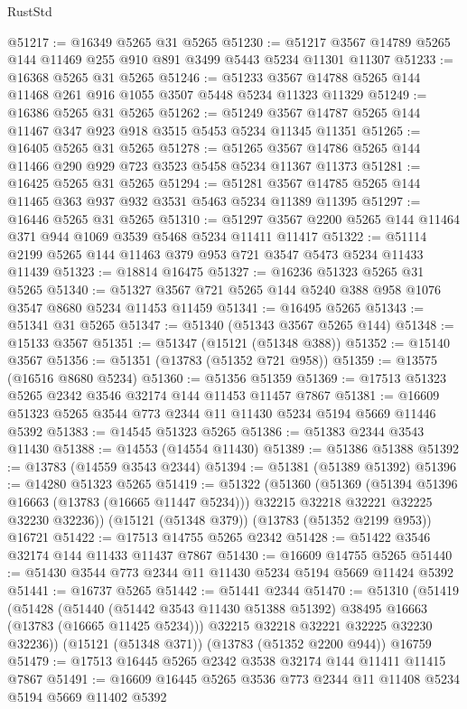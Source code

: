 \begin{lexlean}{RustStd}
\begin{coremodule}
@51217 := @16349 @5265 @31 @5265
@51230 := @51217 @3567 @14789 @5265 @144 @11469 @255 @910 @891 @3499 @5443 @5234 @11301 @11307
@51233 := @16368 @5265 @31 @5265
@51246 := @51233 @3567 @14788 @5265 @144 @11468 @261 @916 @1055 @3507 @5448 @5234 @11323 @11329
@51249 := @16386 @5265 @31 @5265
@51262 := @51249 @3567 @14787 @5265 @144 @11467 @347 @923 @918 @3515 @5453 @5234 @11345 @11351
@51265 := @16405 @5265 @31 @5265
@51278 := @51265 @3567 @14786 @5265 @144 @11466 @290 @929 @723 @3523 @5458 @5234 @11367 @11373
@51281 := @16425 @5265 @31 @5265
@51294 := @51281 @3567 @14785 @5265 @144 @11465 @363 @937 @932 @3531 @5463 @5234 @11389 @11395
@51297 := @16446 @5265 @31 @5265
@51310 := @51297 @3567 @2200 @5265 @144 @11464 @371 @944 @1069 @3539 @5468 @5234 @11411 @11417
@51322 := @51114 @2199 @5265 @144 @11463 @379 @953 @721 @3547 @5473 @5234 @11433 @11439
@51323 := @18814 @16475
@51327 := @16236 @51323 @5265 @31 @5265
@51340 := @51327 @3567 @721 @5265 @144 @5240 @388 @958 @1076 @3547 @8680 @5234 @11453 @11459
@51341 := @16495 @5265
@51343 := @51341 @31 @5265
@51347 := @51340 (@51343 @3567 @5265 @144)
@51348 := @15133 @3567
@51351 := @51347 (@15121 (@51348 @388))
@51352 := @15140 @3567
@51356 := @51351 (@13783 (@51352 @721 @958))
@51359 := @13575 (@16516 @8680 @5234)
@51360 := @51356 @51359
@51369 := @17513 @51323 @5265 @2342 @3546 @32174 @144 @11453 @11457 @7867
@51381 := @16609 @51323 @5265 @3544 @773 @2344 @11 @11430 @5234 @5194 @5669 @11446 @5392
@51383 := @14545 @51323 @5265
@51386 := @51383 @2344 @3543 @11430
@51388 := @14553 (@14554 @11430)
@51389 := @51386 @51388
@51392 := @13783 (@14559 @3543 @2344)
@51394 := @51381 (@51389 @51392)
@51396 := @14280 @51323 @5265
@51419 := @51322
    (@51360
      (@51369
        (@51394 @51396 @16663 (@13783 (@16665 @11447 @5234)))
        @32215
        @32218
        @32221
        @32225
        @32230
        @32236))
    (@15121 (@51348 @379))
    (@13783 (@51352 @2199 @953))
    @16721
@51422 := @17513 @14755 @5265 @2342
@51428 := @51422 @3546 @32174 @144 @11433 @11437 @7867
@51430 := @16609 @14755 @5265
@51440 := @51430 @3544 @773 @2344 @11 @11430 @5234 @5194 @5669 @11424 @5392
@51441 := @16737 @5265
@51442 := @51441 @2344
@51470 := @51310
    (@51419
      (@51428
        (@51440 (@51442 @3543 @11430 @51388 @51392) @38495 @16663 (@13783 (@16665 @11425 @5234)))
        @32215
        @32218
        @32221
        @32225
        @32230
        @32236))
    (@15121 (@51348 @371))
    (@13783 (@51352 @2200 @944))
    @16759
@51479 := @17513 @16445 @5265 @2342 @3538 @32174 @144 @11411 @11415 @7867
@51491 := @16609 @16445 @5265 @3536 @773 @2344 @11 @11408 @5234 @5194 @5669 @11402 @5392

\end{coremodule}
\end{lexlean}
